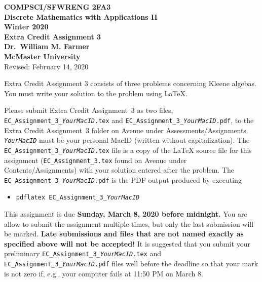 \documentclass[11pt,fleqn]{article}
\newcommand{\bsp}{\begin{sloppypar}}
\newcommand{\esp}{\end{sloppypar}}
\begin{document}
\begin{center}

  {\large \textbf{COMPSCI/SFWRENG 2FA3}}\\[2mm]
  {\large \textbf{Discrete Mathematics with Applications II}}\\[2mm]
  {\large \textbf{Winter 2020}}\\[8mm]
  {\huge \textbf{Extra Credit Assignment 3}}\\[6mm]
  {\large \textbf{Dr.~William M. Farmer}}\\[2mm]
  {\large \textbf{McMaster University}}\\[6mm]
  {\large Revised: February 14, 2020}

\end{center}

\medskip

Extra Credit Assignment 3 consists of three problems concerning Kleene
algebas.  You must write your solution to the problem using LaTeX.

\bsp
Please submit Extra Credit Assignment~3 as two files,
\texttt{EC\_Assignment\_3\_\emph{YourMacID}.tex} and
\texttt{EC\_Assignment\_3\_\emph{YourMacID}.pdf}, to the Extra Credit
Assignment~3 folder on Avenue under Assessments/Assignments.
\texttt{\emph{YourMacID}} must be your personal MacID (written without
capitalization).  The \texttt{EC\_Assignment\_3\_\emph{YourMacID}.tex}
file is a copy of the LaTeX source file for this assignment
(\texttt{EC\_Assignment\_3.tex} found on Avenue under
Contents/Assignments) with your solution entered after the problem.
The \texttt{EC\_Assignment\_3\_\emph{YourMacID}.pdf} is the PDF output
produced by executing
\esp

\begin{itemize}

  \item[] \texttt{pdflatex EC\_Assignment\_3\_\emph{YourMacID}}

\end{itemize}

This assignment is due \textbf{Sunday, March 8, 2020 before
  midnight.}  You are allow to submit the assignment multiple times,
but only the last submission will be marked.  \textbf{Late submissions
  and files that are not named exactly as specified above will not be
  accepted!}  It is suggested that you submit your preliminary
\texttt{EC\_Assignment\_3\_\emph{YourMacID}.tex} and
\texttt{EC\_Assignment\_3\_\emph{YourMacID}.pdf} files well before the
deadline so that your mark is not zero if, e.g., your computer fails
at 11:50 PM on March 8.
\end{document}
